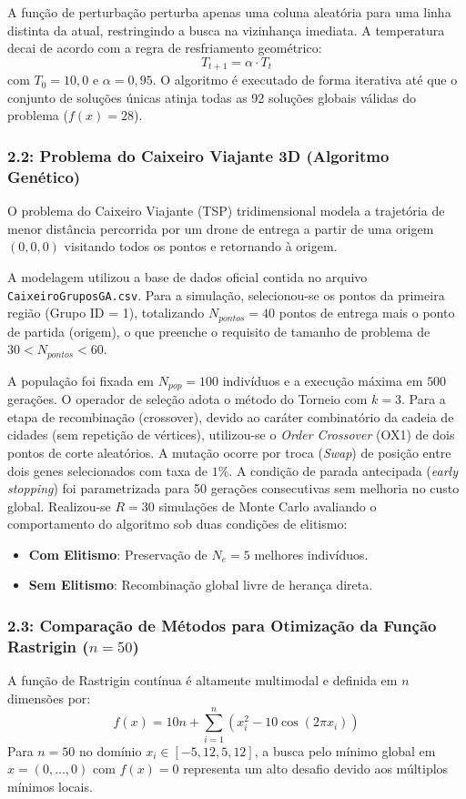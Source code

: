 \documentclass[journal,onecolumn]{IEEEtran}
\begin{document}
A função de perturbação perturba apenas uma coluna aleatória para uma linha distinta da atual, restringindo a busca na vizinhança imediata. A temperatura decai de acordo com a regra de resfriamento geométrico:
\begin{equation}
T_{t+1} = \alpha \cdot T_t
\end{equation}
com $T_0 = 10{,}0$ e $\alpha = 0{,}95$. O algoritmo é executado de forma iterativa até que o conjunto de soluções únicas atinja todas as 92 soluções globais válidas do problema ($f(x) = 28$).

\subsubsection{2.2: Problema do Caixeiro Viajante 3D (Algoritmo Genético)}
O problema do Caixeiro Viajante (TSP) tridimensional modela a trajetória de menor distância percorrida por um drone de entrega a partir de uma origem $(0,0,0)$ visitando todos os pontos e retornando à origem.

A modelagem utilizou a base de dados oficial contida no arquivo \texttt{CaixeiroGruposGA.csv}. Para a simulação, selecionou-se os pontos da primeira região (Grupo ID = 1), totalizando $N_{pontos} = 40$ pontos de entrega mais o ponto de partida (origem), o que preenche o requisito de tamanho de problema de $30 < N_{pontos} < 60$.

A população foi fixada em $N_{pop} = 100$ indivíduos e a execução máxima em $500$ gerações. O operador de seleção adota o método do Torneio com $k=3$. Para a etapa de recombinação (crossover), devido ao caráter combinatório da cadeia de cidades (sem repetição de vértices), utilizou-se o \textit{Order Crossover} (OX1) de dois pontos de corte aleatórios. A mutação ocorre por troca (\textit{Swap}) de posição entre dois genes selecionados com taxa de $1\%$. A condição de parada antecipada (\textit{early stopping}) foi parametrizada para 50 gerações consecutivas sem melhoria no custo global. Realizou-se $R=30$ simulações de Monte Carlo avaliando o comportamento do algoritmo sob duas condições de elitismo:
\begin{itemize}
    \item \textbf{Com Elitismo}: Preservação de $N_e = 5$ melhores indivíduos.
    \item \textbf{Sem Elitismo}: Recombinação global livre de herança direta.
\end{itemize}

\subsubsection{2.3: Comparação de Métodos para Otimização da Função Rastrigin ($n=50$)}
A função de Rastrigin contínua é altamente multimodal e definida em $n$ dimensões por:
\begin{equation}
f(x) = 10n + \sum_{i=1}^{n} \left( x_i^2 - 10\cos(2\pi x_i) \right)
\end{equation}
Para $n=50$ no domínio $x_i \in [-5{,}12, 5{,}12]$, a busca pelo mínimo global em $x = (0,\dots,0)$ com $f(x)=0$ representa um alto desafio devido aos múltiplos mínimos locais.
\end{document}
